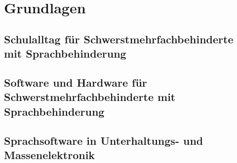 \section{Grundlagen}

	\subsection{Schulalltag für Schwerstmehrfachbehinderte mit Sprachbehinderung}
	\subsection{Software und Hardware für Schwerstmehrfachbehinderte mit Sprachbehinderung}
	\subsection{Sprachsoftware in Unterhaltungs- und Massenelektronik}